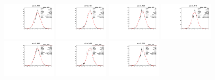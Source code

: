 \begin{figure}[h]\centering
    \includegraphics[width=0.24\textwidth]{figure/io/polarization/pull_polarization_alpha0_4600.pdf}
    \includegraphics[width=0.24\textwidth]{figure/io/polarization/pull_polarization_alpha0_4612.pdf}
    \includegraphics[width=0.24\textwidth]{figure/io/polarization/pull_polarization_alpha0_4626.pdf}
    \includegraphics[width=0.24\textwidth]{figure/io/polarization/pull_polarization_alpha0_4640.pdf}
    \includegraphics[width=0.24\textwidth]{figure/io/polarization/pull_polarization_alpha0_4660.pdf}
    \includegraphics[width=0.24\textwidth]{figure/io/polarization/pull_polarization_alpha0_4680.pdf}
    \includegraphics[width=0.24\textwidth]{figure/io/polarization/pull_polarization_alpha0_4700.pdf}

\end{figure}
